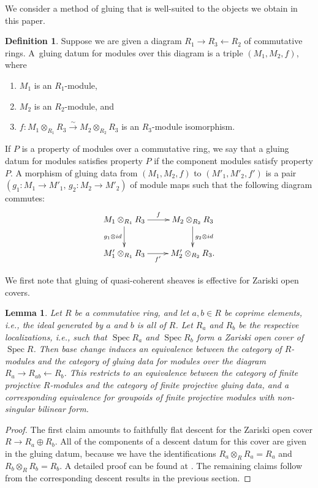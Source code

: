 \documentclass[11pt]{article}
\DeclareMathOperator{\Spec}{Spec}
\newcommand{\simto}{\overset{\sim}{\to}}
\newtheorem{lem}[thm]{Lemma}
\theoremstyle{definition}
\newtheorem{defn}[thm]{Definition}
\begin{document}
We consider a method of gluing that is well-suited to the objects we obtain in this paper.

\begin{defn}Suppose we are given a diagram $R_1 \to R_3 \leftarrow R_2$ of commutative rings. A~gluing datum for modules over this diagram is a triple $(M_1, M_2, f)$, where
\begin{enumerate}\itemsep=0pt
\item[1)] $M_1$ is an $R_1$-module,
\item[2)] $M_2$ is an $R_2$-module, and
\item[3)] $f\colon M_1 \otimes_{R_1} R_3 \simto M_2 \otimes_{R_2} R_3$ is an $R_3$-module isomorphism.
\end{enumerate}
If $P$ is a property of modules over a commutative ring, we say that a gluing datum for modules satisfies property $P$ if the component modules satisfy property $P$. A morphism of gluing data from $(M_1, M_2, f)$ to $(M'_1, M'_2, f')$ is a pair $(g_1\colon M_1 \to M'_1,\, g_2\colon M_2 \to M'_2)$ of module maps such that the following diagram commutes:
\begin{gather*} \xymatrix{ M_1 \otimes_{R_1} R_3 \ar[r]^-{f} \ar[d]_{g_1 \otimes {\rm id}} & M_2 \otimes_{R_2} R_3 \ar[d]^{g_2 \otimes {\rm id}} \\ M'_1 \otimes_{R_1} R_3 \ar[r]_-{f'} & M'_2 \otimes_{R_2} R_3. } \end{gather*}
\end{defn}

We first note that gluing of quasi-coherent sheaves is effective for Zariski open covers.

\begin{lem} \label{lem:zariski-gluing-data-for-modules}Let $R$ be a commutative ring, and let $a,b \in R$ be coprime elements, i.e., the ideal generated by $a$ and $b$ is all of $R$. Let $R_a$ and $R_b$ be the respective localizations, i.e., such that $\Spec R_a$ and $\Spec R_b$ form a Zariski open cover of $\Spec R$. Then base change induces an equivalence between the category of $R$-modules and the category of gluing data for modules over the diagram $R_a \to R_{ab} \leftarrow R_b$. This restricts to an equivalence between the category of finite projective $R$-modules and the category of finite projective gluing data, and a corresponding equivalence for groupoids of finite projective modules with non-singular bilinear form.
\end{lem}
\begin{proof}
The first claim amounts to faithfully flat descent for the Zariski open cover $R \to R_a \oplus R_b$. All of the components of a descent datum for this cover are given in the gluing datum, because we have the identifications $R_a \otimes_{R} R_a = R_a$ and $R_b \otimes_{R} R_b = R_b$. A detailed proof can be found at \cite[\href{https://stacks.math.columbia.edu/tag/00EQ}{Lemma 00EQ}]{Stacks}. The remaining claims follow from the corresponding descent results in the previous section.
\end{proof}
\end{document}
